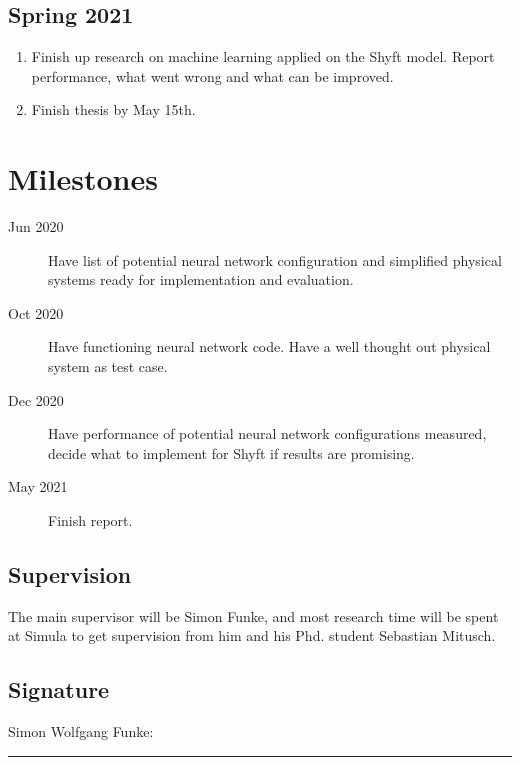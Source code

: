 \documentclass[a4paper,12pt,english]{article}
\begin{document}
\subsection{Spring 2021} 
\begin{enumerate}
\item Finish up research on machine learning applied on the Shyft model. Report performance, what went wrong and what can be improved.
\item Finish thesis by May 15th.
\end{enumerate}
\section{Milestones}
\begin{description}
\item[Jun 2020] Have list of potential neural network configuration and simplified physical systems ready for implementation and evaluation.
\item[Oct 2020] Have functioning neural network code. Have a well thought out physical system as test case.
\item[Dec 2020] Have performance of potential neural network configurations measured, decide what to implement for Shyft if results are promising.
\item[May 2021] Finish report.
\end{description}

\subsection{Supervision}
The main supervisor will be Simon Funke, and most research time will be spent at Simula to get supervision from him and his Phd. student Sebastian Mitusch. 

\subsection{Signature}
Simon Wolfgang Funke: \\
\noindent\rule[0.5ex]{\linewidth}{1pt}\\




\end{document}
